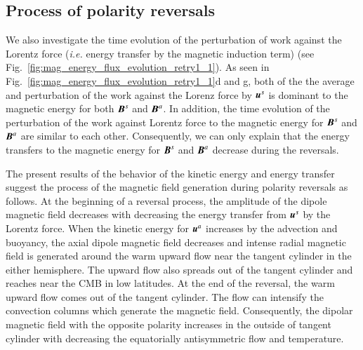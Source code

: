 {\color{red}
\subsection{Process of polarity reversals}
We also investigate the time evolution of the perturbation of work against the Lorentz force ({\it i.e.} energy transfer by the magnetic induction term) (see Fig.~\ref{fig:mag_energy_flux_evolution_retry1_1}).
{\color{teal}
As seen in Fig.~\ref{fig:mag_energy_flux_evolution_retry1_1}d and g, both of the the average and perturbation of the work against the Lorenz force by $\mbox{\boldmath$u$}^s$ is dominant to the magnetic energy for both $\mbox{\boldmath$B$}^s$ and $\mbox{\boldmath$B$}^a$.
}
{\color{teal}
In addition, the time evolution of the perturbation of the work against Lorentz force to the magnetic energy for $\mbox{\boldmath$B$}^s$ and $\mbox{\boldmath$B$}^a$ are similar to each other.
}
{\color{teal}
Consequently, we can only explain that the energy transfers to the magnetic energy for $\mbox{\boldmath$B$}^s$ and $\mbox{\boldmath$B$}^a$ decrease during the reversals.
}



The present results of the behavior of the kinetic energy and energy transfer suggest the process of the magnetic field generation during polarity reversals as follows.
At the beginning of a reversal process, the amplitude of the dipole magnetic field decreases with decreasing the energy transfer from $\mbox{\boldmath$u$}^s$ by the Lorentz force. 
When the kinetic energy for $\mbox{\boldmath$u$}^a$ increases by the advection and buoyancy, the axial dipole magnetic field decreases and intense radial magnetic field is generated around the warm upward flow near the tangent cylinder in the either hemisphere. 
The upward flow also spreads out of the tangent cylinder and reaches near the CMB in low latitudes. 
At the end of the reversal, the warm upward flow comes out of the tangent cylinder. 
The flow can intensify the convection columns which generate the magnetic field. 
Consequently, the dipolar magnetic field with the opposite polarity increases in the outside of tangent cylinder with decreasing the equatorially antisymmetric flow and temperature.

}
